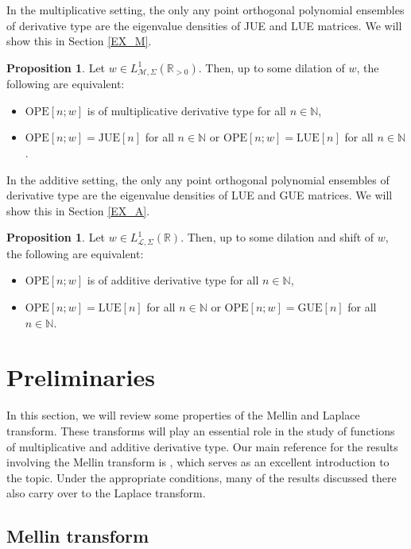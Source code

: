 \documentclass[a4paper,12pt,oneside]{article}
\theoremstyle{definition}
\newtheorem{prop}[defi]{Proposition}
\newcommand{\N}{\mathbb{N}}
\newcommand{\R}{\mathbb{R}}
\newcommand{\MT}[1]{\mathcal{M}#1}
\newcommand{\LT}[1]{\mathcal{L}#1}
\begin{document}
In the multiplicative setting, the only any point orthogonal polynomial ensembles of derivative type are the eigenvalue densities of JUE and LUE matrices. We will show this in Section \ref{EX_M}.

\begin{prop}\label{MDT_OPE}
Let $w\in L^{1}_{\MT{},\Sigma}(\R_{>0})$. Then, up to some dilation of $w$, the following are equivalent:
\begin{itemize}
        \item[$i)$] $\text{OPE}[n;w]$ is of multiplicative derivative type for all $n\in\N$,
        \item[$ii)$] $\text{OPE}[n;w]=\text{JUE}[n]$ for all $n\in\N$ or $\text{OPE}[n;w]=\text{LUE}[n]$ for all $n\in\N$.
    \end{itemize}
\end{prop}

In the additive setting, the only any point orthogonal polynomial ensembles of derivative type are the eigenvalue densities of LUE and GUE matrices. We will show this in Section \ref{EX_A}.

\begin{prop}\label{ADT_OPE}
Let $w\in L^{1}_{\LT{},\Sigma}(\R)$. Then, up to some dilation and shift of $w$, the following are equivalent:
\begin{itemize}
        \item[$i)$] $\text{OPE}[n;w]$ is of additive derivative type for all $n\in\N$,
        \item[$ii)$] $\text{OPE}[n;w]=\text{LUE}[n]$ for all $n\in\N$ or $\text{OPE}[n;w]=\text{GUE}[n]$ for all $n\in\N$.
    \end{itemize}
\end{prop}

\section{Preliminaries} \label{PRELIM}

In this section, we will review some properties of the Mellin and Laplace transform. These transforms will play an essential role in the study of functions of multiplicative and additive derivative type. Our main reference for the results involving the Mellin transform is \cite{BJ:MT}, which serves as an excellent introduction to the topic. Under the appropriate conditions, many of the results discussed there also carry over to the Laplace transform. 


\subsection{Mellin transform} \label{PRELIM_M}
\end{document}

